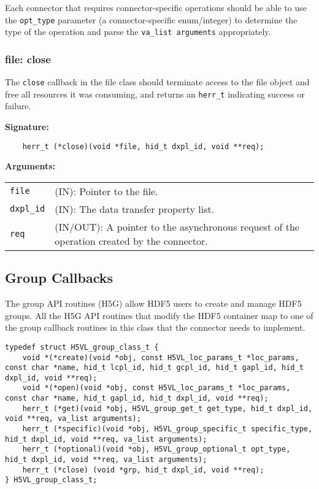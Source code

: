 Each connector that requires connector-specific operations should be able to use the \texttt{opt\_type} parameter (a connector-specific enum/integer) to determine the type of the operation and parse the \texttt{va\_list arguments} appropriately.

\subsubsection{file: close}
The \texttt{close} callback in the file class should terminate access to
the file object and free all resources it was consuming, and returns
an \texttt{herr\_t} indicating success or failure.\bigskip\bigskip

\begin{mdframed}[style=bgbox]
\textbf{Signature:}
\begin{lstlisting}
    herr_t (*close)(void *file, hid_t dxpl_id, void **req);
\end{lstlisting}

\textbf{Arguments:}\\
\begin{tabular}{l p{13.5cm}}
  \texttt{file} & (IN): Pointer to the file.\\
  \texttt{dxpl\_id} & (IN): The data transfer property list.\\
  \texttt{req} & (IN/OUT): A pointer to the asynchronous request of the
  operation created by the connector.\\
\end{tabular}
\end{mdframed}


\subsection{Group Callbacks}
The group API routines (H5G) allow HDF5 users to create and manage
HDF5 groups. All the H5G API routines that modify the HDF5 container
map to one of the group callback routines in this class that the
connector needs to implement.

\begin{lstlisting}[caption={Structure for group callback routines, H5VLconnector.h}, captionpos=b, label={lst:Groupclass}]
typedef struct H5VL_group_class_t {                                              
    void *(*create)(void *obj, const H5VL_loc_params_t *loc_params, const char *name, hid_t lcpl_id, hid_t gcpl_id, hid_t gapl_id, hid_t dxpl_id, void **req);
    void *(*open)(void *obj, const H5VL_loc_params_t *loc_params, const char *name, hid_t gapl_id, hid_t dxpl_id, void **req);
    herr_t (*get)(void *obj, H5VL_group_get_t get_type, hid_t dxpl_id, void **req, va_list arguments);
    herr_t (*specific)(void *obj, H5VL_group_specific_t specific_type, hid_t dxpl_id, void **req, va_list arguments);
    herr_t (*optional)(void *obj, H5VL_group_optional_t opt_type, hid_t dxpl_id, void **req, va_list arguments);
    herr_t (*close) (void *grp, hid_t dxpl_id, void **req);
} H5VL_group_class_t; 
\end{lstlisting}

